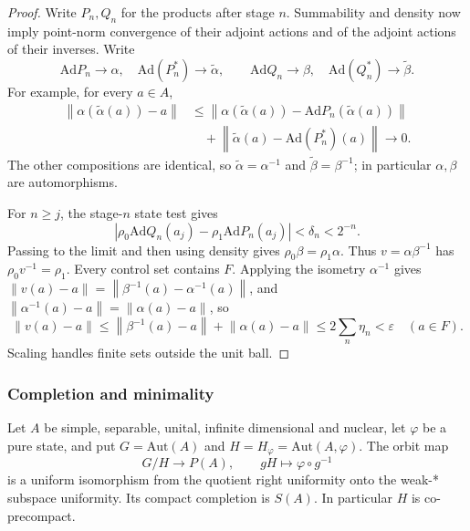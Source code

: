 \begin{proof}
Write $P_n,Q_n$ for the products after stage $n$. Summability and density
now imply point-norm convergence of their adjoint actions and of the adjoint
actions of their inverses. Write 
\begin{equation*}
\mathrm{Ad} P_n\to\alpha,\quad \mathrm{Ad}(P_n^*)\to\widetilde\alpha, \qquad 
\mathrm{Ad} Q_n\to\beta,\quad \mathrm{Ad}(Q_n^*)\to\widetilde\beta.
\end{equation*}
For example, for every $a\in A$, 
\begin{equation*}
\begin{split}
\left\|\alpha(\widetilde\alpha(a))-a\right\| &\leq
\left\|\alpha(\widetilde\alpha(a))- \mathrm{Ad} P_n(\widetilde\alpha(a))\right\| \\
&\quad+\left\|\widetilde\alpha(a)-\mathrm{Ad}(P_n^*)(a)\right\|\longrightarrow0.
\end{split}\end{equation*}
The other compositions are identical, so $\widetilde\alpha=\alpha^{-1}$ and $\widetilde\beta=\beta^{-1}$; in particular $\alpha,\beta$ are automorphisms.

For $n\geq j$, the stage-$n$ state test gives 
\begin{equation*}
\left|\rho_0\mathrm{Ad} Q_n(a_j)-\rho_1\mathrm{Ad} P_n(a_j)\right|
<\delta_n<2^{-n}.
\end{equation*}
Passing to the limit and then using density gives $\rho_0\beta=\rho_1\alpha$. Thus $v=\alpha\beta^{-1}$ has $\rho_0v^{-1}=\rho_1$. Every control set
contains $F$. Applying the isometry $\alpha^{-1}$ gives $\left\|v(a)-a\right \|=\left\|\beta^{-1}(a)-\alpha^{-1}(a)\right\|$, and $\left\|\alpha^{-1}(a)-a\right\|=\left\|\alpha(a)-a\right\|$, so 
\begin{equation*}
\left\|v(a)-a\right\|\leq\left\|\beta^{-1}(a)-a\right\|
+\left\|\alpha(a)-a\right\| \leq2\sum_n\eta_n<\varepsilon\quad(a\in F).
\end{equation*}
Scaling handles finite sets outside the unit ball.
\end{proof}


\subsubsection{Completion and minimality}

\begin{proposition}\label{prop:cu-completion}
 Let $A$ be simple, separable, unital, infinite
dimensional and nuclear, let $\varphi$ be a pure state, and put $G=\mathrm{Aut}(A)$ and $H=H_\varphi=\mathrm{Aut}(A,\varphi)$. The orbit map 
\begin{equation*}
G/H\longrightarrow P(A),\qquad gH\longmapsto\varphi\circ g^{-1}
\end{equation*}
is a uniform isomorphism from the quotient right uniformity onto the weak-*
subspace uniformity. Its compact completion is $S(A)$. In particular $H$ is
co-precompact.
\end{proposition}

